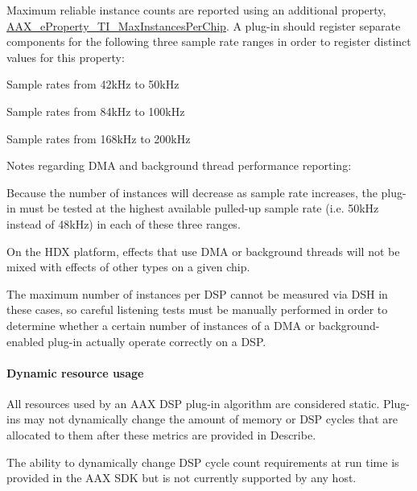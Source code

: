 Maximum reliable instance counts are reported using an additional property, \mbox{\hyperlink{a00662_a13e384f22825afd3db6d68395b79ce0da5b85e213113b7f0f7ee4bac4f5eaa59d}{A\+A\+X\+\_\+e\+Property\+\_\+\+T\+I\+\_\+\+Max\+Instances\+Per\+Chip}}. A plug-\/in should register separate components for the following three sample rate ranges in order to register distinct values for this property\+: 
\begin{DoxyEnumerate}
\item Sample rates from 42k\+Hz to 50k\+Hz  
\item Sample rates from 84k\+Hz to 100k\+Hz  
\item Sample rates from 168k\+Hz to 200k\+Hz  
\end{DoxyEnumerate}

Notes regarding D\+MA and background thread performance reporting\+: 
\begin{DoxyItemize}
\item Because the number of instances will decrease as sample rate increases, the plug-\/in must be tested at the highest available pulled-\/up sample rate (i.\+e. 50k\+Hz instead of 48k\+Hz) in each of these three ranges.  
\item On the H\+DX platform, effects that use D\+MA or background threads will not be mixed with effects of other types on a given chip.  
\item The maximum number of instances per D\+SP cannot be measured via D\+SH in these cases, so careful listening tests must be manually performed in order to determine whether a certain number of instances of a D\+MA or background-\/enabled plug-\/in actually operate correctly on a D\+SP. 
\end{DoxyItemize}

\hypertarget{a00832_subsubsection__dynamic_resource_usage_}{}\paragraph{Dynamic resource usage}\label{a00832_subsubsection__dynamic_resource_usage_}
 All resources used by an A\+AX D\+SP plug-\/in algorithm are considered static. Plug-\/ins may not dynamically change the amount of memory or D\+SP cycles that are allocated to them after these metrics are provided in Describe.

The ability to dynamically change D\+SP cycle count requirements at run time is provided in the A\+AX S\+DK but is not currently supported by any host.

